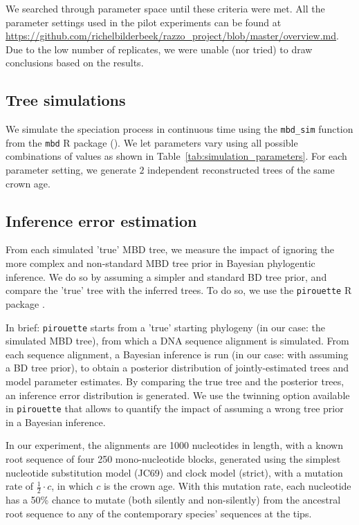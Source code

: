 We searched through parameter space until these criteria were met.
All the parameter settings used in the pilot experiments can be found at 
\url{https://github.com/richelbilderbeek/razzo_project/blob/master/overview.md}.
Due to the low number of replicates, we were unable (nor tried)
to draw conclusions based on the results. 

\subsection{Tree simulations}

We simulate the speciation process in continuous time 
using the \verb;mbd_sim; function from the \verb;mbd; R package (\citep{mbd}).
We let parameters vary using all possible combinations of values 
as shown in Table~\ref{tab:simulation_parameters}.
For each parameter setting, 
we generate $2$  
independent reconstructed trees of the same crown age.

\subsection{Inference error estimation}

From each simulated 'true' MBD tree, we measure the impact of
ignoring the more complex and non-standard MBD tree prior in
Bayesian phylogentic inference.
We do so by assuming a simpler and standard BD tree prior,
and compare the 'true' tree with the inferred trees.
To do so, we use the \verb;pirouette; R package \citep{pirouette}.

In brief: \verb;pirouette; starts from 
a 'true' starting phylogeny (in our case: the simulated MBD tree), 
from which a DNA sequence alignment is simulated. 
From each sequence alignment, a Bayesian 
inference is run (in our case: with assuming a BD tree prior), 
to obtain a posterior distribution of jointly-estimated trees and model parameter estimates.
By comparing the true tree and the posterior trees, 
an inference error distribution is generated.
We use the twinning option available in \verb;pirouette;
that allows to quantify the impact of assuming a wrong
tree prior in a Bayesian inference.

In our experiment, the alignments are 1000 nucleotides in length, 
with a known root sequence of four 250 mono-nucleotide blocks, 
generated using the simplest nucleotide substitution model (JC69) 
and clock model (strict), with a mutation rate of $\frac{1}{2}\cdot c$,
in which $c$ is the crown age. 
With this mutation rate, each nucleotide has a 50\% chance
to mutate (both silently and non-silently) from the ancestral root sequence 
to any of the contemporary species' sequences at the tips.

